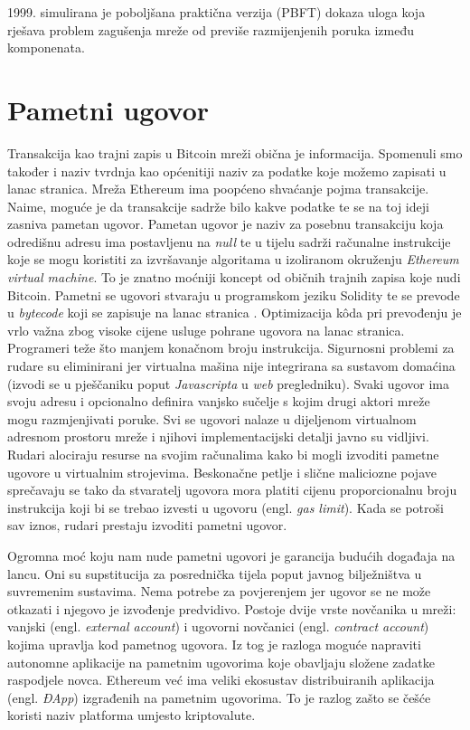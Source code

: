 \documentclass[utf8, zavrsni]{fer}
\begin{document}
1999. simulirana je poboljšana praktična verzija (PBFT) \cite{castro1999practical} dokaza uloga koja rješava problem zagušenja mreže od previše razmijenjenih poruka između komponenata.
\section{Pametni ugovor}
Transakcija kao trajni zapis u Bitcoin mreži obična je informacija. Spomenuli smo također i naziv tvrdnja kao općenitiji naziv za podatke koje možemo zapisati u lanac stranica. Mreža Ethereum ima poopćeno shvaćanje pojma transakcije. Naime, moguće je da transakcije sadrže bilo kakve podatke te se na toj ideji zasniva pametan ugovor. Pametan ugovor je naziv za posebnu transakciju koja odredišnu adresu ima postavljenu na \textit{null} te u tijelu sadrži računalne instrukcije koje se mogu koristiti za izvršavanje algoritama u izoliranom okruženju \textit{Ethereum virtual machine}. To je znatno moćniji koncept od običnih trajnih zapisa koje nudi Bitcoin. Pametni se ugovori stvaraju u programskom jeziku Solidity te se prevode u \textit{bytecode} koji se zapisuje na lanac stranica \cite{wood2014ethereum}. Optimizacija kôda pri prevođenju je vrlo važna zbog visoke cijene usluge pohrane ugovora na lanac stranica. Programeri teže što manjem konačnom broju instrukcija. Sigurnosni problemi za rudare su eliminirani jer virtualna mašina nije integrirana sa sustavom domaćina (izvodi se u pješčaniku poput \textit{Javascripta} u \textit{web} pregledniku). Svaki ugovor ima svoju adresu i opcionalno definira vanjsko sučelje s kojim drugi aktori mreže mogu razmjenjivati poruke. Svi se ugovori nalaze u dijeljenom virtualnom adresnom prostoru mreže i njihovi implementacijski detalji javno su vidljivi. Rudari alociraju resurse na svojim računalima kako bi mogli izvoditi pametne ugovore u virtualnim strojevima. Beskonačne petlje i slične maliciozne pojave sprečavaju se tako da stvaratelj ugovora mora platiti cijenu proporcionalnu broju instrukcija koji bi se trebao izvesti u ugovoru (engl. \textit{gas limit}). Kada se potroši sav iznos, rudari prestaju izvoditi pametni ugovor.

Ogromna moć koju nam nude pametni ugovori je garancija budućih događaja na lancu. Oni su supstitucija za posrednička tijela poput javnog bilježništva u suvremenim sustavima. Nema potrebe za povjerenjem jer ugovor se ne može otkazati i njegovo je izvođenje predvidivo. Postoje dvije vrste novčanika u mreži: vanjski (engl. \textit{external account}) i ugovorni novčanici (engl. \textit{contract account}) kojima upravlja kod pametnog ugovora. Iz tog je razloga moguće napraviti autonomne aplikacije na pametnim ugovorima koje obavljaju složene zadatke raspodjele novca. Ethereum već ima veliki ekosustav distribuiranih aplikacija (engl. \textit{ĐApp}) izgrađenih na pametnim ugovorima. To je razlog zašto se češće koristi naziv platforma umjesto kriptovalute.
\end{document}
